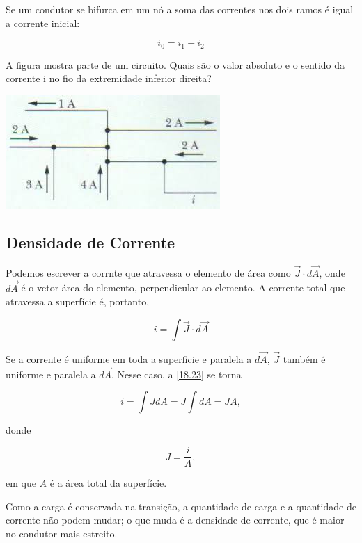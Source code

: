 Se um condutor se bifurca em um nó a soma das correntes nos dois ramos é igual a corrente inicial:

\begin{equation}
    i_0=i_1+i_2
\end{equation}

A figura mostra parte de um circuito. Quais são o valor absoluto e o sentido da corrente i no fio da extremidade inferior direita?
\begin{center}
\includegraphics[scale=.7]{./imagens/27.jpg}
\end{center}

\subsection{Densidade de Corrente}

Podemos escrever a corrnte que atravessa o elemento de área como $\vec{J}\cdot d\vec{A}$, onde $d\vec{A}$ é o vetor área do elemento, perpendicular ao elemento. A corrente total que atravessa a superfície é, portanto,

\begin{equation}\label{18.23}
    i=\int \vec{J}\cdot d\vec{A}
\end{equation}

Se a corrente é uniforme em toda a superficie e paralela a $d\vec{A}$, $\vec{J}$ também é uniforme e paralela a $d\vec{A}$. Nesse caso, a \eqref{18.23} se torna

\begin{equation*}
    i=\int J dA= J\int dA = JA,
\end{equation*}

donde

\begin{equation}
    J=\dfrac{i}{A},
\end{equation}

em que $A$ é a área total da superfície.

Como a carga é conservada na transição, a quantidade de carga e a quantidade de corrente não podem mudar; o que muda é a densidade de corrente, que é maior no condutor mais estreito.

